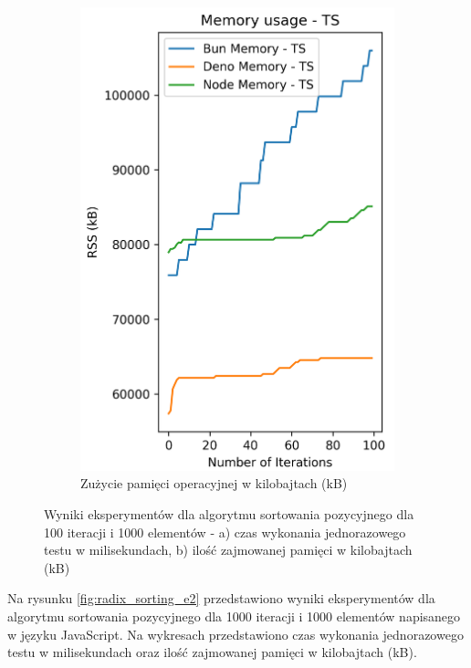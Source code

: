 \begin{figure}[H]
\begin{subfigure}[b]{0.42\textwidth}
    \includegraphics[width=\textwidth]{Figures/sorting/sorting_radix_100_1000_ts_memory.png}
    \caption{Zużycie pamięci operacyjnej w kilobajtach (kB)}
    \label{fig:radix_sorting_e1_ts_memory}
  \end{subfigure}
  \caption{Wyniki eksperymentów dla algorytmu sortowania pozycyjnego dla 100 iteracji i 1000 elementów - a) czas wykonania jednorazowego testu w milisekundach, b) ilość zajmowanej pamięci w kilobajtach (kB)}
  \label{fig:radix_sorting_e1_ts}
\end{figure}

Na rysunku \ref{fig:radix_sorting_e2} przedstawiono wyniki eksperymentów dla algorytmu sortowania pozycyjnego dla 1000 iteracji i 1000 elementów napisanego w języku JavaScript. Na wykresach przedstawiono czas wykonania jednorazowego testu w milisekundach oraz ilość zajmowanej pamięci w kilobajtach (kB).

